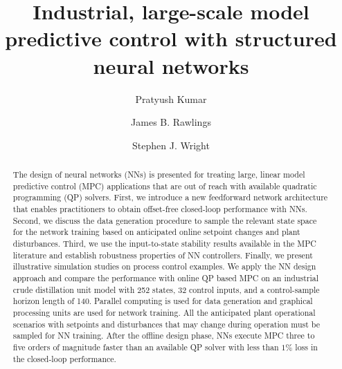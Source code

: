 \documentclass[preprint,5p, twocolumn, authoryear]{elsarticle}
\begin{document}
\begin{frontmatter}


\title{Industrial, large-scale model predictive control 
with structured neural networks}

\author[label1]{Pratyush Kumar}

\author[label1]{James B. Rawlings}

\author[label2]{Stephen J. Wright}

\address[label1]{Department of Chemical Engineering, University of California, Santa Barbara, CA 93106, United States}
\address[label2]{Computer Sciences Department, University of Wisconsin-Madison, Madison, WI 53706, United States}

\begin{abstract}
The design of neural networks (NNs) is presented 
for treating large, linear model predictive control (MPC) applications that 
are out of reach with available quadratic programming (QP)
solvers. First, we introduce a new feedforward
network architecture that enables practitioners to 
obtain offset-free closed-loop performance with NNs.
Second, we discuss the data generation procedure 
to sample the relevant state space for the network 
training based on anticipated online setpoint changes and
plant disturbances. Third, we use the 
input-to-state stability results 
available in the MPC literature
and establish robustness 
properties of NN controllers.
Finally, we present illustrative
simulation studies on 
process control examples. 
We apply the NN design approach
and compare the performance with online QP based MPC on an industrial crude
distillation unit model with 252 states, 32 control inputs, 
and a control-sample horizon length of 140. Parallel computing 
is used for data generation and graphical processing units are used for
network training. All the anticipated plant operational scenarios 
with setpoints and disturbances that may change
during operation must be sampled for NN training.
After the offline design phase, 
NNs execute MPC 
three to five orders of magnitude faster
than an available QP solver with less than $1\%$
loss in the closed-loop performance.
\end{abstract}


\end{frontmatter}
\end{document}
